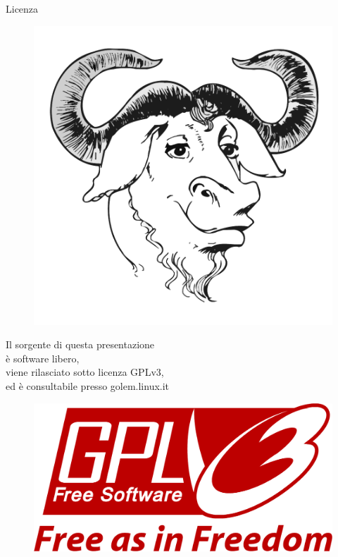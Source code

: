 \documentclass{beamer}
\begin{document}
\begin{frame}
  \begin{block}{Licenza}
    \centering
    \begin{minipage}{.18\linewidth}
      \begin{figure}
        \centering
        \includegraphics[width=.9\linewidth]{img/gnu.pdf}
      \end{figure}
    \end{minipage}
    \hfill
    \begin{minipage}{.6\linewidth}
      \centering
      Il sorgente di questa presentazione\\
      è software libero,\\
      viene rilasciato sotto licenza GPLv3,\\
      ed è consultabile presso golem.linux.it
    \end{minipage}
    \hfill
    \begin{minipage}{.18\linewidth}
      \begin{figure}
        \centering
        \includegraphics[width=.9\linewidth]{img/gpl3.pdf}
      \end{figure}
    \end{minipage}

  \end{block}

\end{frame}
\end{document}
